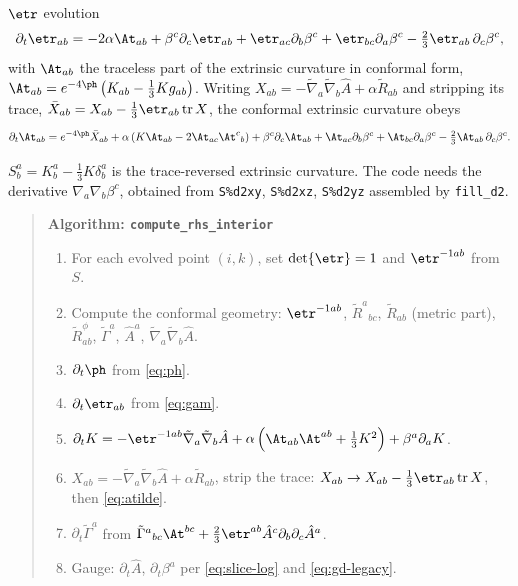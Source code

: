 $\etr$ evolution
\begin{equation}
\label{eq:gam}
\partial_t \etr_{ab} = -2\alpha \At_{ab}
  + \beta^c\partial_c\etr_{ab}
  + \etr_{ac}\partial_b\beta^c + \etr_{bc}\partial_a\beta^c
  - \tfrac{2}{3}\etr_{ab}\,\partial_c\beta^c,
\end{equation}
with $\At_{ab}$ the traceless part of the extrinsic curvature in conformal form,
$\At_{ab} = e^{-4\ph}\left(K_{ab} - \tfrac{1}{3}K g_{ab}\right)$. Writing
$X_{ab} = -\tilde{\nabla}_a\tilde{\nabla}_b\hat{A} + \alpha\tilde{R}_{ab}$ and
stripping its trace, $\bar{X}_{ab} = X_{ab} - \tfrac{1}{3}\etr_{ab}\tr X$, the
conformal extrinsic curvature obeys
\begin{equation}
\label{eq:atilde}
\partial_t\At_{ab} = e^{-4\ph}\bar{X}_{ab}
  + \alpha\left(K\At_{ab} - 2\At_{ac}\At^{c}{}_{b}\right)
  + \beta^c\partial_c\At_{ab}
  + \At_{ac}\partial_b\beta^c + \At_{bc}\partial_a\beta^c
  - \tfrac{2}{3}\At_{ab}\,\partial_c\beta^c .
\end{equation}

$S^a_b = K^a_b - \tfrac{1}{3}K\delta^a_b$ is the trace-reversed extrinsic
curvature. The code needs the derivative $\nabla_a\nabla_b\beta^c$, obtained
from \texttt{S\%d2xy}, \texttt{S\%d2xz}, \texttt{S\%d2yz} assembled by
\texttt{fill\_d2}.

\begin{quote}\small
\textbf{Algorithm: \texttt{compute\_rhs\_interior}}
\begin{enumerate}
\item For each evolved point $(i,k)$, set $\det\etr = 1$ and
      $\etr^{-1ab}$ from $S$.
\item Compute the conformal geometry:
      $\etr^{-1ab}$, $\tilde{R}^a{}_{bc}$,
      $\tilde{R}_{ab}$ (metric part), $\tilde{R}^\phi_{ab}$,
      $\tilde{\Gamma}^a$, $\hat{A}^a$, $\tilde{\nabla}_a\tilde{\nabla}_b\hat{A}$.
\item $\partial_t\ph$ from \eqref{eq:ph}.
\item $\partial_t\etr_{ab}$ from \eqref{eq:gam}.
\item $\partial_t K = -\etr^{-1ab}\tilde{\nabla}_a\tilde{\nabla}_b\hat{A}
      + \alpha\left(\At_{ab}\At^{ab} + \tfrac{1}{3}K^2\right)
      + \beta^a\partial_a K$.
\item $X_{ab} = -\tilde{\nabla}_a\tilde{\nabla}_b\hat{A} + \alpha\tilde{R}_{ab}$,
      strip the trace: $X_{ab} \to X_{ab} - \tfrac{1}{3}\etr_{ab}\tr X$, then
      \eqref{eq:atilde}.
\item $\partial_t\tilde{\Gamma}^a$ from
      $\tilde{\Gamma}^a{}_{bc}\At^{bc} + \tfrac{2}{3}\etr^{ab}\hat{A}^c
      \partial_b\partial_c\hat{A}^a$.
\item Gauge: $\partial_t\hat{A}$, $\partial_t\beta^a$ per \eqref{eq:slice-log} and \eqref{eq:gd-legacy}.
\end{enumerate}
\end{quote}

